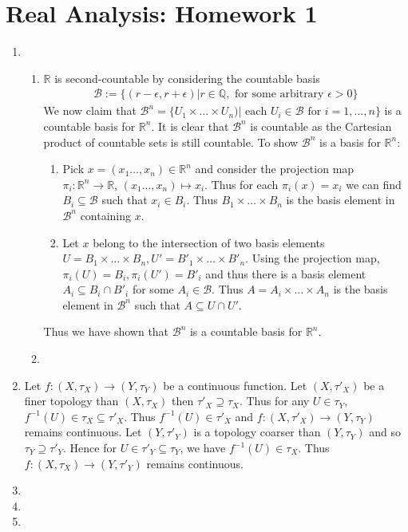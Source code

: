 \documentclass[a4paper,12pt]{article}
\theoremstyle{definition}
\begin{document}
\section*{Real Analysis: Homework 1}

\begin{enumerate}

\item
\begin{enumerate}
\item $\mathbb{R}$ is second-countable by considering the countable basis 
\begin{align*}
\mathcal{B}:=\{(r-\epsilon,r+\epsilon)| r \in \mathbb{Q}, \text{ for some arbitrary }\epsilon >0\}
\end{align*}
We now claim that $\mathcal{B}^n = \{U_1\times \ldots\times U_n)|\text{ each }U_i\in \mathcal{B}\text{ for }i=1,\ldots, n\}$ is a countable basis for $\mathbb{R}^n$. It is clear that $\mathcal{B}^n$ is countable as the Cartesian product of countable sets is still countable. To show $\mathcal{B}^n$ is a basis for $\mathbb{R}^n$:
\begin{enumerate}[(1)]
\item Pick $x = (x_1\ldots, x_n) \in \mathbb{R}^n$ and consider the projection map $\pi_i: \mathbb{R}^n \to \mathbb{R}$, $(x_1\ldots, x_n) \mapsto x_i$. Thus for each $\pi_i(x) = x_i$ we can find $B_i \subseteq \mathcal{B}$ such that $x_i \in B_i$. Thus $B_1 \times \ldots \times B_n$ is the basis element in $\mathcal{B}^n$ containing $x$.
\item Let $x$ belong to the intersection of two basis elements $U = B_1 \times \ldots \times B_n, U' = B'_1 \times \ldots \times B'_n$. Using the projection map, $\pi_i(U) = B_i, \pi_i(U') = B'_i$ and thus there is a basis element $A_i \subseteq B_i \cap B'_i$ for some $A_i \in \mathcal{B}$. Thus $A = A_i \times \ldots \times A_n$ is the basis element in $\mathcal{B}^n$ such that $A \subseteq U \cap U'$.
\end{enumerate}
Thus we have shown that $\mathcal{B}^n$ is a countable basis for $\mathbb{R}^n$.



\item
\end{enumerate}

\item Let $f : (X, \tau_X) \to (Y, \tau_Y)$ be a continuous function. Let $(X,\tau'_X)$ be a finer topology than $(X, \tau_X)$ then $\tau'_X \supseteq \tau_X$. Thus for any $U \in \tau_Y$, $f^{-1}(U) \in \tau_X \subseteq \tau'_X$. Thus $f^{-1}(U) \in \tau'_X$ and $f : (X, \tau'_X) \to (Y, \tau_Y)$ remains continuous. Let $(Y,\tau'_Y)$ is a topology coarser than $(Y, \tau_Y)$ and so $\tau_Y \supseteq\tau'_Y$. Hence for $U \in \tau'_Y \subseteq \tau_Y$, we have $f^{-1}(U)\in \tau_X$. Thus  $f : (X, \tau_X) \to (Y, \tau'_Y)$ remains continuous.

\item

\item

\item
\end{enumerate}
\end{document}

